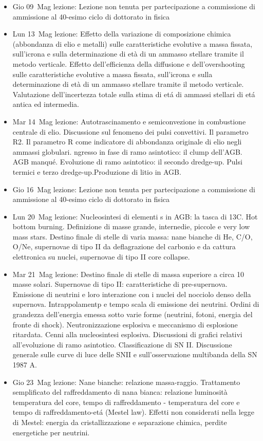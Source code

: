 \begin{itemize}
\item Gio 09 Mag lezione: Lezione non tenuta per partecipazione a commissione di ammissione al 40-esimo ciclo di dottorato in fisica 
\item Lun 13 Mag lezione: Effetto della variazione di composizione chimica (abbondanza di elio e metalli) sulle caratteristiche evolutive a massa fissata, sull'icrona e sulla determinazione di età di un ammasso stellare tramite il metodo verticale. Effetto dell'efficienza della diffusione e dell'overshooting sulle caratteristiche evolutive a massa fissata, sull'icrona e sulla determinazione di età di un ammasso stellare tramite il metodo verticale. Valutazione dell'incertezza totale sulla stima di et\'a di ammassi stellari di et\'a antica ed intermedia. 
\item Mar 14 Mag lezione: Autotrascinamento e semiconvezione in combustione centrale di elio. Discussione sul fenomeno dei pulsi convettivi. Il parametro R2. Il parametro R come indicatore di abbondanza originale di elio negli ammassi globulari. ngresso in fase di ramo asintotico: il clump dell'AGB. AGB manqu\'e. Evoluzione di ramo asintotico: il secondo dredge-up. Pulsi termici e terzo dredge-up.Produzione di litio in AGB. 
\item Gio 16 Mag lezione: Lezione non tenuta per partecipazione a commissione di ammissione al 40-esimo ciclo di dottorato in fisica 
\item Lun 20 Mag lezione: Nucleosintesi di elementi s in AGB: la tasca di 13C. Hot bottom burning. Definizione di masse grande, internedie, piccole e very low mass stars. Destino finale di stelle di varia massa: nane bianche di He, C/O, O/Ne, supernovae di tipo II da deflagrazione del carbonio e da cattura elettronica su nuclei, supernovae di tipo II core collapse. 
\item Mar 21 Mag lezione: Destino finale di stelle di massa superiore a circa 10 masse solari. Supernovae di tipo II: caratteristiche di pre-supernova. Emissione di neutrini e loro interazione con i nuclei del nocciolo denso della supernova. Intrappolamentp e tempo scala di emissione dei neutrini. Ordini di grandezza dell'energia emessa sotto varie forme (neutrini, fotoni, energia del fronte di shock). Neutronizzazione esplosiva e meccanismo di esplosione ritardata. Cenni alla nucleosintesi esplosiva. Discussioni di grafici relativi all'evoluzione di ramo asintotico. Classificazione di SN II. Discussione generale sulle curve di luce delle SNII e sull'osservazione multibanda della SN 1987 A. 
\item Gio 23 Mag lezione: Nane bianche: relazione massa-raggio. Trattamento semplificato del raffreddamento di nana bianca: relazione luminosità temperatura del core, tempo di raffreddamento - temperatura del core e tempo di raffreddamento-et\'a (Mestel law). Effetti non considerati nella legge di Mestel: energia da cristallizzazione e separazione chimica, perdite energetiche per neutrini. 
\end{itemize}
